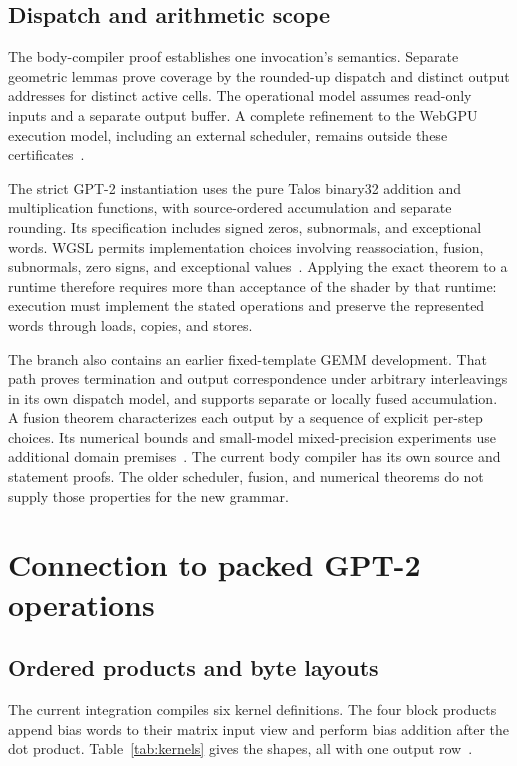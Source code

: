 \documentclass[11pt]{article}
\begin{document}
\subsection{Dispatch and arithmetic scope}

The body-compiler proof establishes one invocation's semantics.  Separate geometric lemmas prove coverage by the rounded-up dispatch and distinct output addresses for distinct active cells.  The operational model assumes read-only inputs and a separate output buffer.  A complete refinement to the WebGPU execution model, including an external scheduler, remains outside these certificates~\cite{execution}.

The strict GPT-2 instantiation uses the pure Talos binary32 addition and multiplication functions, with source-ordered accumulation and separate rounding.  Its specification includes signed zeros, subnormals, and exceptional words.  WGSL permits implementation choices involving reassociation, fusion, subnormals, zero signs, and exceptional values~\cite{wgsl}.  Applying the exact theorem to a runtime therefore requires more than acceptance of the shader by that runtime: execution must implement the stated operations and preserve the represented words through loads, copies, and stores.

The branch also contains an earlier fixed-template GEMM development.  That path proves termination and output correspondence under arbitrary interleavings in its own dispatch model, and supports separate or locally fused accumulation.  A fusion theorem characterizes each output by a sequence of explicit per-step choices.  Its numerical bounds and small-model mixed-precision experiments use additional domain premises~\cite{legacy}.  The current body compiler has its own source and statement proofs.  The older scheduler, fusion, and numerical theorems do not supply those properties for the new grammar.

\section{Connection to packed GPT-2 operations}

\subsection{Ordered products and byte layouts}

The current integration compiles six kernel definitions.  The four block products append bias words to their matrix input view and perform bias addition after the dot product.  Table~\ref{tab:kernels} gives the shapes, all with one output row~\cite{packedsource}.
\end{document}
